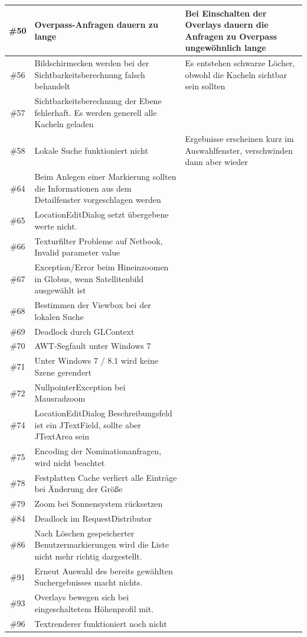 \documentclass[10pt]{scrreprt}
\begin{document}
\begin{longtable}{|c|p{5.2cm}|p{8.2cm}|}
\hline
\#50 & Overpass-Anfragen dauern zu lange & Bei Einschalten der Overlays dauern die Anfragen zu Overpass ungewöhnlich lange \\
\hline
\#56 & Bildschirmecken werden bei der Sichtbarkeitsberechnung falsch behandelt & Es entstehen schwarze Löcher, obwohl die Kacheln sichtbar sein sollten \\
\hline
\#57 & Sichtbarkeitsberechnung der Ebene fehlerhaft. Es werden generell alle Kacheln geladen & \\
\hline
\#58 & Lokale Suche funktioniert nicht & Ergebnisse erscheinen kurz im Auswahlfenster, verschwinden dann aber wieder \\
\hline
\#64 & Beim Anlegen einer Markierung sollten die Informationen aus dem Detailfenster vorgeschlagen werden & \\
\hline
\#65 & LocationEditDialog setzt übergebene werte nicht. & \\
\hline
\#66 & Texturfilter Probleme auf Netbook, Invalid parameter value & \\
\hline
\#67 & Exception/Error beim Hineinzoomen in Globus, wenn Satellitenbild ausgewählt ist & \\
\hline
\#68 & Bestimmen der Viewbox bei der lokalen Suche & \\
\hline
\#69 & Deadlock durch GLContext & \\
\hline
\#70 & AWT-Segfault unter Windows 7 & \\
\hline
\#71 & Unter Windows 7 / 8.1 wird keine Szene gerendert & \\
\hline
\#72 & NullpointerException bei Mausradzoom & \\
\hline
\#74 & LocationEditDialog Beschreibungsfeld ist ein JTextField, sollte aber JTextArea sein & \\
\hline
\#75 & Encoding der Nominationanfragen, wird nicht beachtet & \\
\hline
\#78 & Festplatten Cache verliert alle Einträge bei Änderung der Größe & \\
\hline
\#79 & Zoom bei Sonnensystem rücksetzen & \\
\hline
\#84 & Deadlock im RequestDistributor & \\
\hline
\#86 & Nach Löschen gespeicherter Benutzermarkierungen wird die Liste nicht mehr richtig dargestellt. & \\
\hline
\#91 & Erneut Auswahl des bereits gewählten Suchergebnisses macht nichts. & \\
\hline
\#93 & Overlays bewegen sich bei eingeschaltetem Höhenprofil mit. & \\
\hline
\#96 & Textrenderer funktioniert noch nicht & \\
\hline
\end{longtable}
\newpage
\end{document}
